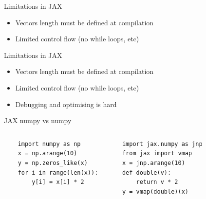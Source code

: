\documentclass[aspectratio=169]{beamer}
\begin{document}
\begin{frame}{Limitations in JAX}
  \begin{itemize}
    \item Vectors length must be defined at compilation
    \item Limited control flow (no while loops, etc)
  \end{itemize}
\end{frame}

\begin{frame}{Limitations in JAX}
  \begin{itemize}
    \item Vectors length must be defined at compilation
    \item Limited control flow (no while loops, etc)
    \item Debugging and optimising is hard
  \end{itemize}
\end{frame}

\begin{frame}[fragile]{JAX numpy vs numpy}
  \begin{columns}
    \begin{verbatim}
    import numpy as np
    x = np.arange(10)
    y = np.zeros_like(x)
    for i in range(len(x)):
        y[i] = x[i] * 2
    \end{verbatim}
    \begin{verbatim}
    import jax.numpy as jnp
    from jax import vmap
    x = jnp.arange(10)
    def double(v):
        return v * 2
    y = vmap(double)(x)
    \end{verbatim}
  \end{columns}
\end{frame}
\end{document}
